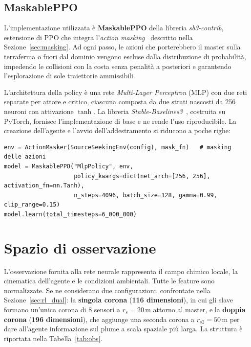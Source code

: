 \subsection{MaskablePPO}
\label{sec:maskable}

L'implementazione utilizzata \`e \textbf{MaskablePPO} della libreria \emph{sb3-contrib},
estensione di PPO che integra l'\emph{action masking}~\citep{maskable_ppo} descritto nella
Sezione~\ref{sec:masking}. Ad ogni passo, le azioni che porterebbero il master sulla
terraferma o fuori dal dominio vengono escluse dalla distribuzione di probabilit\`a,
impedendo le collisioni con la costa senza penalit\`a a posteriori e garantendo
l'esplorazione di sole traiettorie ammissibili.

L'architettura della policy \`e una rete \emph{Multi-Layer Perceptron} (MLP) con due reti
separate per attore e critico, ciascuna composta da due strati nascosti da 256 neuroni
con attivazione $\tanh$. La libreria \emph{Stable-Baselines3}~\citep{sb3}, costruita su
PyTorch, fornisce l'implementazione di base e ne rende l'uso riproducibile. La creazione
dell'agente e l'avvio dell'addestramento si riducono a poche righe:

\begin{lstlisting}
env = ActionMasker(SourceSeekingEnv(config), mask_fn)   # masking delle azioni
model = MaskablePPO("MlpPolicy", env,
                    policy_kwargs=dict(net_arch=[256, 256], activation_fn=nn.Tanh),
                    n_steps=4096, batch_size=128, gamma=0.99, clip_range=0.15)
model.learn(total_timesteps=6_000_000)
\end{lstlisting}

\section{Spazio di osservazione}
\label{sec:osservazione}

L'osservazione fornita alla rete neurale rappresenta il campo chimico locale, la
cinematica dell'agente e le condizioni ambientali. Tutte le feature sono normalizzate.
Se ne considerano due configurazioni, confrontate nella
Sezione~\ref{sec:rl_dual}: la \textbf{singola corona} (\textbf{116 dimensioni}), in cui
gli slave formano un'unica corona di 8 sensori a $r_s = 20\,\text{m}$ attorno al master,
e la \textbf{doppia corona} (\textbf{196 dimensioni}), che aggiunge una seconda corona a
$r_{s2} = 50\,\text{m}$ per dare all'agente informazione sul plume a scala spaziale
pi\`u larga. La struttura \`e riportata nella Tabella~\ref{tab:obs}.

